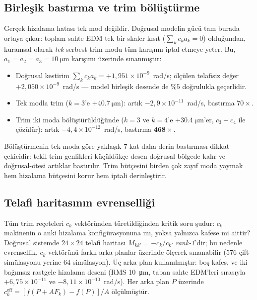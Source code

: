 \documentclass[preprint,12pt]{elsarticle}
\begin{document}
\subsection{Birleşik bastırma ve trim bölüştürme}
\label{sec:trim-birlesik}

Gerçek hizalama hatası tek mod değildir. Doğrusal modelin gücü tam burada
ortaya çıkar: toplam sahte EDM tek bir skaler kısıt
($\sum_k c_k a_k = 0$) olduğundan, kuramsal olarak \emph{tek} serbest
trim modu tüm karışımı iptal etmeye yeter. Bu, $a_1=a_2=a_3=\SI{10}{\micro\meter}$
karışımı üzerinde sınanmıştır:

\begin{itemize}
  \item Doğrusal kestirim $\sum_k c_k a_k = +1{,}951\times10^{-9}$~rad/s;
    ölçülen telafisiz değer $+2{,}050\times10^{-9}$~rad/s — model birleşik
    desende de $\%5$ doğrulukla geçerlidir.
  \item Tek modla trim ($k=3$'e $+\SI{40.7}{\micro\meter}$):
    artık $-2{,}9\times10^{-11}$~rad/s, bastırma $70\times$.
  \item Trim iki moda bölüştürüldüğünde ($k=3$ ve $k=4$'e
    $+\SI{30.4}{\micro\meter}$'er, $c_3+c_4$ ile çözülür):
    artık $-4{,}4\times10^{-12}$~rad/s, bastırma $\mathbf{468\times}$.
\end{itemize}

Bölüştürmenin tek moda göre yaklaşık $7$ kat daha derin bastırması
dikkat çekicidir: tekil trim genlikleri küçüldükçe desen doğrusal bölgede
kalır ve doğrusal-ötesi artıklar bastırılır. Trim bütçesini birden çok
zayıf moda yaymak hem hizalama bütçesini korur hem iptali derinleştirir.

\subsection{Telafi haritasının evrenselliği}
\label{sec:trim-evrensellik}

Tüm trim reçeteleri $c_k$ vektöründen türetildiğinden kritik soru şudur:
$c_k$ makinenin o anki hizalama konfigürasyonuna mı, yoksa yalnızca kafese
mi aittir? Doğrusal sistemde $24\times24$ telafi haritası
$M_{kk'}=-c_k/c_{k'}$ \emph{rank-1}'dir; bu nedenle evrensellik, $c_k$
vektörünü farklı arka planlar üzerinde ölçerek sınanabilir (576 çift
simülasyonu yerine 64 simülasyon). Üç arka plan kullanılmıştır: boş kafes,
ve iki bağımsız rastgele hizalama deseni (RMS \SI{10}{\micro\meter},
taban sahte EDM'leri sırasıyla $+6{,}75\times10^{-11}$ ve
$-8{,}11\times10^{-10}$~rad/s). Her arka plan $P$ üzerinde
$c_k^\mathrm{eff} = [f(P + A F_k) - f(P)]/A$ ölçülmüştür.
\end{document}
